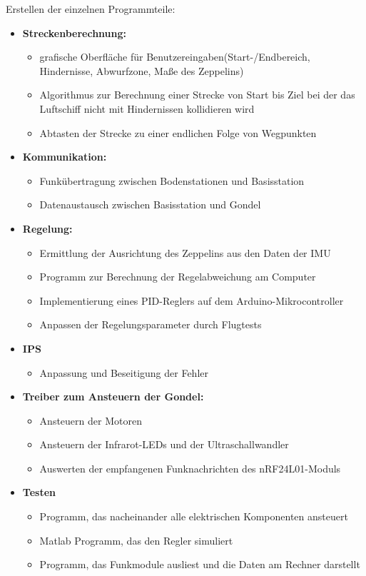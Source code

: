 \documentclass[lang=ngerman,inputenc=utf8,fontsize=10pt]{ldvarticle}
\begin{document}
Erstellen der einzelnen Programmteile:
\begin{itemize}
\item \textbf{Streckenberechnung:}
	\begin{itemize}
	\item grafische Oberfläche für Benutzereingaben(Start-/Endbereich, Hindernisse, 		Abwurfzone, Maße des Zeppelins)
	\item Algorithmus zur Berechnung einer Strecke von Start bis Ziel bei der das 			Luftschiff nicht mit Hindernissen kollidieren wird
	\item Abtasten der Strecke zu einer endlichen Folge von Wegpunkten	
	\end{itemize}
\item \textbf{Kommunikation:}
	\begin{itemize}
	\item Funkübertragung zwischen Bodenstationen und Basisstation
	\item Datenaustausch zwischen Basisstation und Gondel
	\end{itemize}
\item \textbf{Regelung:}
	\begin{itemize}
	\item Ermittlung der Ausrichtung des Zeppelins aus den Daten der IMU  
	\item Programm zur Berechnung der Regelabweichung am Computer
	\item Implementierung eines PID-Reglers auf dem Arduino-Mikrocontroller
	\item Anpassen der Regelungsparameter durch Flugtests  
	\end{itemize}
\item \textbf{IPS}
	\begin{itemize}
	\item Anpassung und Beseitigung der Fehler
	\end{itemize}
\item \textbf{Treiber zum Ansteuern der Gondel:}
	\begin{itemize}
	\item Ansteuern der Motoren
	\item Ansteuern der Infrarot-LEDs und der Ultraschallwandler
	\item Auswerten der empfangenen Funknachrichten des nRF24L01-Moduls
	\end{itemize}
\item \textbf{Testen}
	\begin{itemize}
	\item Programm, das nacheinander alle elektrischen Komponenten ansteuert
	\item Matlab Programm, das den Regler simuliert
	\item Programm, das Funkmodule ausliest und die Daten am Rechner darstellt
	\end{itemize}
\end{itemize}
\end{document}
